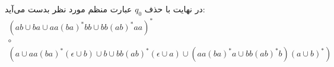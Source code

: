 \begin{enumerate}
\begin{latin}
    \end{latin}
    در نهایت با حذف
    $q_0$
    عبارت منظم مورد نظر بدست می‌آید:
    \begin{gather*}
        (ab \cup ba \cup aa(ba)^*bb \cup bb(ab)^*aa)^*
        \\\circ\\
        (a \cup aa(ba)^*(\epsilon \cup b) \cup b \cup bb(ab)^*(\epsilon \cup a) \cup (aa(ba)^*a \cup bb(ab)^*b)(a \cup b)^*)
    \end{gather*}
\end{enumerate}